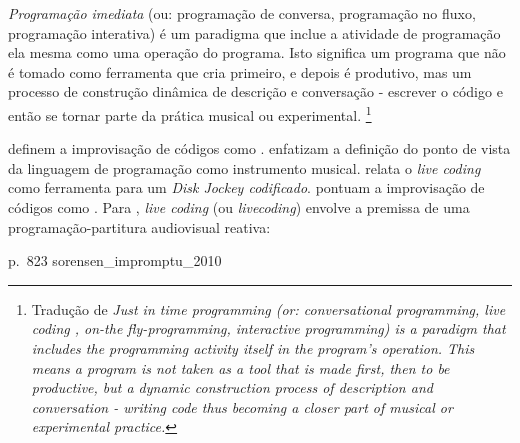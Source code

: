 \begin{citacao}
\emph{Programação imediata} (ou: programação de conversa, programação no fluxo, programação interativa) é um paradigma que inclue a atividade de programação ela mesma como uma operação do programa. Isto significa um programa que não é tomado como ferramenta que cria primeiro, e depois é produtivo, mas um processo de construção dinâmica de descrição e conversação - escrever o código e então se tornar parte da prática musical ou experimental. \cite[Verbete JITLib]{supercollider.org_supercollider_2014}\footnote{Tradução de \emph{Just in time programming (or: conversational programming, live coding , on-the fly-programming, interactive programming) is a paradigm that includes the programming activity itself in the program's operation. This means a program is not taken as a tool that is made first, then to be productive, but a dynamic construction process of description and conversation - writing code thus becoming a closer part of musical or experimental practice.}}
\end{citacao}

 definem a improvisação de códigos como .  enfatizam a definição do ponto de vista da linguagem de programação como instrumento musical.  relata o \emph{live coding} como ferramenta para um \emph{Disk Jockey codificado}.   pontuam a improvisação de códigos como . Para , \emph{live coding} (ou \emph{livecoding}) envolve a premissa de uma programação-partitura audiovisual reativa: 

{p.~823}
{sorensen_impromptu_2010}

